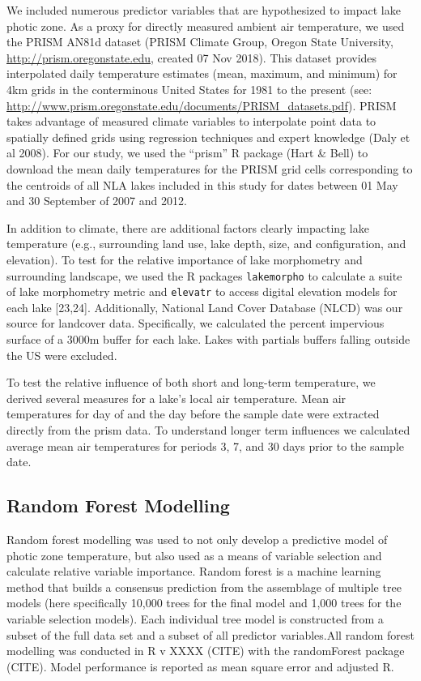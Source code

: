 \documentclass[
]{article}
\begin{document}
We included numerous predictor variables that are hypothesized to impact
lake photic zone. As a proxy for directly measured ambient air
temperature, we used the PRISM AN81d dataset (PRISM Climate Group,
Oregon State University, \url{http://prism.oregonstate.edu}, created 07
Nov 2018). This dataset provides interpolated daily temperature
estimates (mean, maximum, and minimum) for 4km grids in the conterminous
United States for 1981 to the present (see:
\url{http://www.prism.oregonstate.edu/documents/PRISM_datasets.pdf}).
PRISM takes advantage of measured climate variables to interpolate point
data to spatially defined grids using regression techniques and expert
knowledge (Daly et al 2008). For our study, we used the ``prism'' R
package (Hart \& Bell) to download the mean daily temperatures for the
PRISM grid cells corresponding to the centroids of all NLA lakes
included in this study for dates between 01 May and 30 September of 2007
and 2012.

In addition to climate, there are additional factors clearly impacting
lake temperature (e.g., surrounding land use, lake depth, size, and
configuration, and elevation). To test for the relative importance of
lake morphometry and surrounding landscape, we used the R packages
\texttt{lakemorpho} to calculate a suite of lake morphometry metric and
\texttt{elevatr} to access digital elevation models for each lake
{[}23,24{]}. Additionally, National Land Cover Database (NLCD) was our
source for landcover data. Specifically, we calculated the percent
impervious surface of a 3000m buffer for each lake. Lakes with partials
buffers falling outside the US were excluded.

To test the relative influence of both short and long-term temperature,
we derived several measures for a lake's local air temperature. Mean air
temperatures for day of and the day before the sample date were
extracted directly from the prism data. To understand longer term
influences we calculated average mean air temperatures for periods 3, 7,
and 30 days prior to the sample date.

\hypertarget{random-forest-modelling}{%
\subsection{Random Forest Modelling}\label{random-forest-modelling}}

Random forest modelling was used to not only develop a predictive model
of photic zone temperature, but also used as a means of variable
selection and calculate relative variable importance. Random forest is a
machine learning method that builds a consensus prediction from the
assemblage of multiple tree models (here specifically 10,000 trees for
the final model and 1,000 trees for the variable selection models). Each
individual tree model is constructed from a subset of the full data set
and a subset of all predictor variables.All random forest modelling was
conducted in R v XXXX (CITE) with the randomForest package (CITE). Model
performance is reported as mean square error and adjusted R.
\end{document}
